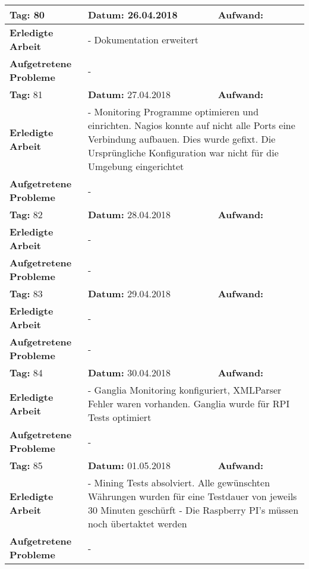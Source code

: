 \begin{longtable}{|p{5cm}|p{5cm}|p{6cm}|}
\rowcolor{heading}\textbf{Tag:} 80 & \textbf{Datum:} 26.04.2018 & \textbf{Aufwand:} \\ \hline
\textbf{Erledigte Arbeit} & \multicolumn{2}{p{11cm}|}{- Dokumentation erweitert} \\ \hline
\textbf{Aufgetretene Probleme} & \multicolumn{2}{p{11cm}|}{-} \\ \hline
\rowcolor{heading}\textbf{Tag:} 81 & \textbf{Datum:} 27.04.2018 & \textbf{Aufwand:} \\ \hline
\textbf{Erledigte Arbeit} & \multicolumn{2}{p{11cm}|}{- Monitoring Programme optimieren und einrichten. Nagios konnte auf nicht alle Ports eine Verbindung aufbauen. Dies wurde gefixt. Die Ursprüngliche Konfiguration war nicht für die Umgebung eingerichtet} \\ \hline
\textbf{Aufgetretene Probleme} & \multicolumn{2}{p{11cm}|}{-} \\ \hline
\rowcolor{heading}\textbf{Tag:} 82 & \textbf{Datum:} 28.04.2018 & \textbf{Aufwand:} \\ \hline
\textbf{Erledigte Arbeit} & \multicolumn{2}{p{11cm}|}{-} \\ \hline
\textbf{Aufgetretene Probleme} & \multicolumn{2}{p{11cm}|}{-} \\ \hline
\rowcolor{heading}\textbf{Tag:} 83 & \textbf{Datum:} 29.04.2018 & \textbf{Aufwand:} \\ \hline
\textbf{Erledigte Arbeit} & \multicolumn{2}{p{11cm}|}{-} \\ \hline
\textbf{Aufgetretene Probleme} & \multicolumn{2}{p{11cm}|}{-} \\ \hline
\rowcolor{heading}\textbf{Tag:} 84 & \textbf{Datum:} 30.04.2018 & \textbf{Aufwand:} \\ \hline
\textbf{Erledigte Arbeit} & \multicolumn{2}{p{11cm}|}{- Ganglia Monitoring konfiguriert, XMLParser Fehler waren vorhanden. Ganglia wurde für RPI Tests optimiert} \\ \hline
\textbf{Aufgetretene Probleme} & \multicolumn{2}{p{11cm}|}{-} \\ \hline
\rowcolor{heading}\textbf{Tag:} 85 & \textbf{Datum:} 01.05.2018 & \textbf{Aufwand:} \\ \hline
\textbf{Erledigte Arbeit} & \multicolumn{2}{p{11cm}|}{- Mining Tests absolviert. Alle gewünschten Währungen wurden für eine Testdauer von jeweils 30 Minuten geschürft \newline
- Die Raspberry PI's müssen noch übertaktet werden} \\ \hline
\textbf{Aufgetretene Probleme} & \multicolumn{2}{p{11cm}|}{-} \\ \hline

\end{longtable}
